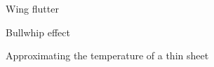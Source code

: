 %
%



\begin{project}{Wing flutter}
	\label{proj:wing}

	
\end{project}










%
%



\begin{project}{Bullwhip effect}
	\label{proj:bullwhip}

	
\end{project}









%
%



\begin{project}{Approximating the temperature of a thin sheet}
	\label{proj:numericalPDE}

	
\end{project}




